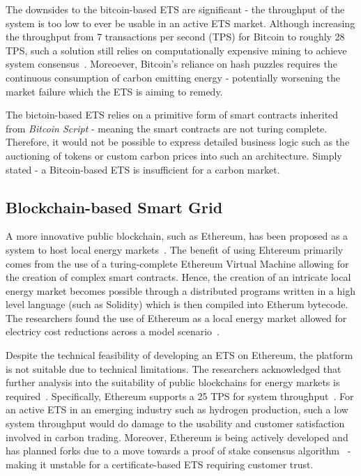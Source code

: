 The downsides to the bitcoin-based ETS are significant - the
throughput of the system is too low to ever be usable in an active
ETS market. Although increasing the throughput from 7 transactions
per second (TPS) for Bitcoin to roughly 28 TPS, such a solution
still relies on computationally expensive mining to achieve
system consensus~\cite{vic15}. Moreoever, Bitcoin's reliance on
hash puzzles requires the continuous consumption of carbon emitting
energy - potentially worsening the market failure which the ETS is aiming to
remedy.

The bictoin-based ETS relies on a primitive form of smart contracts
inherited from \textit{Bitcoin Script} - meaning the smart contracts
are not turing complete. Therefore, it would not be possible to
express detailed business logic such as the auctioning of tokens
or custom carbon prices into such an architecture. Simply stated -
a Bitcoin-based ETS is insufficient for a carbon market.

\subsection{Blockchain-based Smart Grid}
A more innovative public blockchain, such as Ethereum, has been
proposed as a system to host local energy markets~\cite{beer}.
The benefit of using Ehtereum primarily comes from the use of
a turing-complete Ethereum Virtual Machine allowing for
the creation of complex smart contracts. Hence, the creation
of an intricate local energy market becomes possible through a
distributed programs written in a high level language (such as Solidity) which is then compiled into Etherum bytecode. The
researchers found the use of Ethereum as a local energy market
allowed for electricy cost reductions across a
model scenario~\cite{beer}.

Despite the technical feasibility of developing an ETS on
Ethereum, the platform is not suitable due to technical limitations.
The researchers acknowledged that further analysis into the
suitability of public blockchains for energy markets is
required~\cite{beer}. Specifically, Ethereum supports a 25 TPS for
system throughput~\cite{racz}.
For an active ETS in an emerging industry such
as hydrogen production, such a low system throughput would do
damage to the usability and customer satisfaction involved in
carbon trading. Moreover, Ethereum is being actively developed
and has planned forks due to a move towards a proof of stake
consensus algorithm~\cite{pos} - making it unstable
for a certificate-based ETS requiring customer trust.

